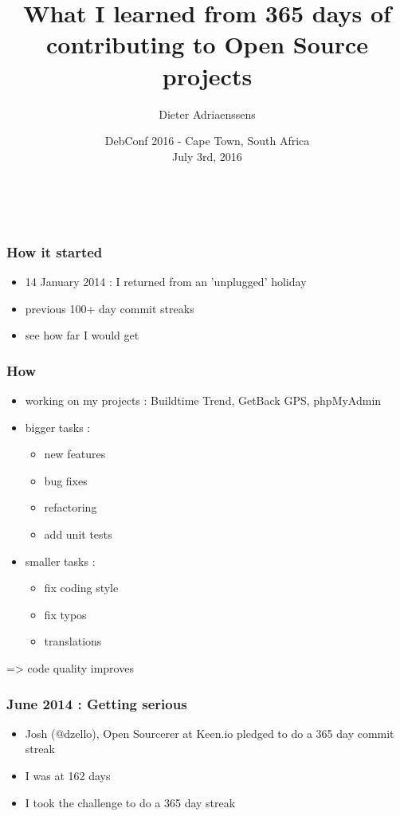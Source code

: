 \documentclass[14pt]{beamer}
\title[365 days of Open Source]{What I learned from 365 days of contributing to Open Source projects}
\author{Dieter Adriaenssens}
\institute[]{Open Source developer - @dcadriaenssens}
\date[DebConf16 3Jul2016]{DebConf 2016 - Cape Town, South Africa\\
July 3rd, 2016}
\begin{document}
  \begin{frame}
    \titlepage
    \vfill
    \begin{center}
      \\[2.5ex]
        {\tiny\CcNote{\CcLongnameByNcSa}}
        \vspace*{-2.5ex}
    \end{center}
  \end{frame}
  \begin{frame}
    \frametitle{How it started}
    \begin{itemize}
      \item 14 January 2014 : I returned from an 'unplugged' holiday
      \item previous 100+ day commit streaks
      \item see how far I would get
    \end{itemize}
  \end{frame}
  \begin{frame}
    \frametitle{How}
    \begin{itemize}
      \item working on my projects : Buildtime Trend, GetBack GPS, phpMyAdmin
      \item bigger tasks :
      \begin{itemize}
        \item new features
        \item bug fixes
        \item refactoring
        \item add unit tests
      \end{itemize}
      \item smaller tasks :
      \begin{itemize}
        \item fix coding style
        \item fix typos
        \item translations
      \end{itemize}
    \end{itemize}
    => code quality improves
  \end{frame}
  \begin{frame}
    \frametitle{June 2014 : Getting serious}
    \begin{itemize}
      \item Josh (@dzello), Open Sourcerer at Keen.io pledged to do a 365 day commit streak
      \item I was at 162 days
      \item I took the challenge to do a 365 day streak
    \end{itemize}
  \end{frame}
\end{document}
